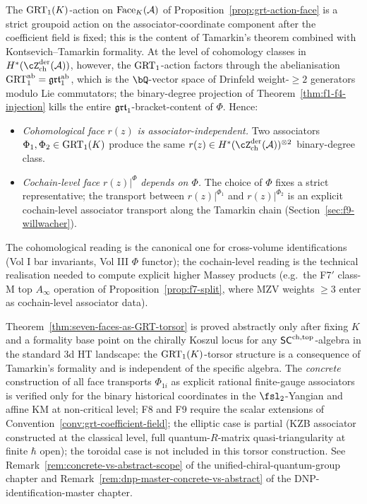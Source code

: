 \begin{remark}
\label{rem:grt-cohomology-vs-cochain}
The $\mathrm{GRT}_1(K)$-action on $\mathrm{Face}_K(\mathcal{A})$ of
Proposition~\ref{prop:grt-action-face} is a strict groupoid action
on the associator-coordinate component after the coefficient field is
fixed; this is the content of Tamarkin's theorem combined with
Kontsevich--Tamarkin formality.
At the level of cohomology classes in
$H^{*}(\cZ^{\mathrm{der}}_{\mathrm{ch}}(\cA))$, however, the
$\mathrm{GRT}_1$-action factors through the abelianisation
$\mathrm{GRT}_1^{\mathrm{ab}} = \mathfrak{grt}_1^{\mathrm{ab}}$, which is the
$\bQ$-vector space of Drinfeld weight-$\geq 2$ generators modulo
Lie commutators; the binary-degree projection
of Theorem~\ref{thm:f1-f4-injection} kills the entire
$\mathfrak{grt}_1$-bracket-content of $\Phi$. Hence:
\begin{itemize}
\item[(a)] \emph{Cohomological face} $r(z)$ \emph{is associator-independent.}
 Two associators $\Phi_1, \Phi_2 \in \mathrm{GRT}_1(K)$ produce the
 same $r(z)\in H^{*}(\cZ^{\mathrm{der}}_{\mathrm{ch}}(\cA))^{\otimes 2}$
 binary-degree class.
\item[(b)] \emph{Cochain-level face} $r(z)|^{\Phi}$
 \emph{depends on $\Phi$.} The choice of $\Phi$ fixes a strict
 representative; the transport between $r(z)|^{\Phi_1}$ and
 $r(z)|^{\Phi_2}$ is an explicit cochain-level associator transport
 along the Tamarkin chain (Section~\ref{sec:f9-willwacher}).
\end{itemize}
The cohomological reading is the canonical one for cross-volume
identifications (Vol I bar invariants, Vol III $\Phi$ functor); the
cochain-level reading is the technical realisation needed to compute
explicit higher Massey products (e.g.\ the F7$'$ class-M top
$A_\infty$ operation of Proposition~\ref{prop:f7-split}, where MZV
weights $\geq 3$ enter as cochain-level associator data).
\end{remark}

\begin{remark}
\label{rem:grt-abstract-vs-concrete}
Theorem~\ref{thm:seven-faces-as-GRT-torsor} is proved abstractly only
after fixing $K$ and a formality base point on the chirally Koszul
locus for any
$\mathsf{SC}^{\mathrm{ch},\mathrm{top}}$-algebra in the standard 3d HT landscape: the
$\mathrm{GRT}_1(K)$-torsor structure is a consequence of Tamarkin's formality
and is independent of the specific algebra. The
\emph{concrete} construction of all face transports
$\Phi_{1i}$ as explicit rational finite-gauge associators is verified
only for the binary historical coordinates in the $\fsl_2$-Yangian and
affine KM at non-critical level; F8 and F9 require the scalar
extensions of Convention~\ref{conv:grt-coefficient-field};
the elliptic case is partial (KZB associator constructed at the
classical level, full quantum-$R$-matrix
quasi-triangularity at finite $\hbar$ open); the toroidal case is
not included in this torsor construction. See
Remark~\ref{rem:concrete-vs-abstract-scope} of the
unified-chiral-quantum-group chapter and
Remark~\ref{rem:dnp-master-concrete-vs-abstract} of the
DNP-identification-master chapter.
\end{remark}

